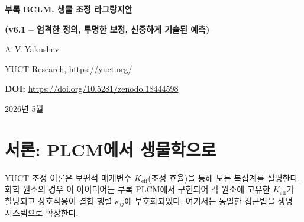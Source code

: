 \documentclass[12pt,a4paper]{article}
\newcommand{\REL}{\mathcal{K}}          %
\begin{document}
	
	\begin{titlepage}
		\centering
		\vspace*{2cm}
		{\Huge\bfseries 부록 BCLM. 생물 조정 라그랑지안\par}
		\vspace{0.3cm}
		{\Large\bfseries (v6.1 – 엄격한 정의, 투명한 보정, 신중하게 기술된 예측)\par}
		\vspace{1.5cm}
		{\large A.\,V.\,Yakushev\par}
		{\normalsize YUCT Research, \url{https://yuct.org/}\par}
		
		\vspace{1.0cm}
		{\normalsize \textbf{DOI:} \url{https://doi.org/10.5281/zenodo.18444598}\par}
		\vspace{1.0cm}
		{\normalsize 2026년 5월\par}
		\vfill
		\begin{abstract}
			\noindent
			본 문서는 생물 조정 라그랑지안(BCLM)을 Yakushev 통일 조정 이론(YUCT)의 일관된 데이터 기반 모듈로 제시한다.
			모든 생물학적 객체에는 YPSDC 프로토콜에 의해 균일하게 정의된 상대 조정 효율 \(\REL\)이 할당된다. 이는 압축비 \(H(\mathcal{A})/H(\kappa)\)를 이론적 최대값으로 정규화한 것이다.
			코돈, 아미노산, 효소, 돌연변이 관련 복구 효율, allometric 상수, 뉴런 매개변수의 완전한 표를 제공한다.
			YUCT 상수에서 유도되고 단백질-단백질 결합 데이터에 대해 보정된 보편적 대수 적합성 규칙은 임의의 두 생물학적 개체 간의 상호작용을 지배한다.
			장수 프로토콜은 반증 가능한 정량적 가설로 공식화되며, 그 예측은 보편적 오차 법칙과 세포 층의 곱셈적 오차 구조로부터 유도된다.
			주요 고급 모듈(시간 조정, 면역, 독물, 다중 생물체, 샤페론, 번역 후 변형)이 복원되고 통일된 \(\REL\) 프레임워크로 표현된다.
			과학적 엄격성을 보장하기 위해 모든 정의, 보정, 한계에 대해 논의한다.
		\end{abstract}
	\end{titlepage}
	
	\tableofcontents
	\newpage
	
	\section{서론: PLCM에서 생물학으로}
	YUCT 조정 이론은 보편적 매개변수 \(K_{\mathrm{eff}}\)(조정 효율)을 통해 모든 복잡계를 설명한다. 화학 원소의 경우 이 아이디어는 부록 PLCM에서 구현되어 각 원소에 고유한 \(K_{\mathrm{eff}}\)가 할당되고 상호작용이 결합 행렬 \(\kappa_{ij}\)에 부호화되었다. 여기서는 동일한 접근법을 생명 시스템으로 확장한다.
	
\end{document}
